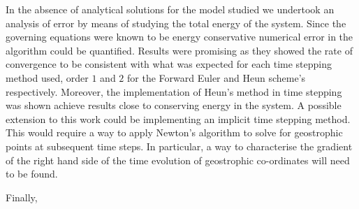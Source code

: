 In the absence of analytical solutions for the model studied we undertook an analysis of error by means of studying the total energy of the system. Since the governing equations were known to be energy conservative \cite{Cullen2006a} numerical error in the algorithm could be quantified. Results were promising as they showed the rate of convergence to be consistent with what was expected for each time stepping method used, order $1$ and $2$ for the Forward Euler and Heun scheme's respectively. Moreover, the implementation of Heun's method in time stepping was shown achieve results close to conserving energy in the system. A possible extension to this work could be implementing an implicit time stepping method. This would require a way to apply Newton's algorithm to solve for geostrophic points at subsequent time steps. In particular, a way to characterise the gradient of the right hand side of the time evolution of geostrophic co-ordinates will need to be found.

Finally, 
